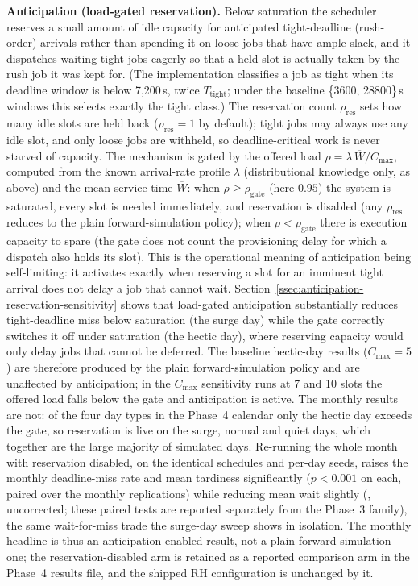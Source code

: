\textbf{Anticipation (load-gated reservation).} Below saturation the scheduler reserves a small amount of idle capacity for anticipated tight-deadline (rush-order) arrivals rather than spending it on loose jobs that have ample slack, and it dispatches waiting tight jobs eagerly so that a held slot is actually taken by the rush job it was kept for. (The implementation classifies a job as tight when its deadline window is below 7{,}200\,s, twice $T_{\text{tight}}$; under the baseline \{3600, 28800\}\,s windows this selects exactly the tight class.) The reservation count $\rho_{\text{res}}$ sets how many idle slots are held back ($\rho_{\text{res}}=1$ by default); tight jobs may always use any idle slot, and only loose jobs are withheld, so deadline-critical work is never starved of capacity. The mechanism is gated by the offered load $\rho = \lambda\,\overline{W}/C_{\max}$, computed from the known arrival-rate profile $\lambda$ (distributional knowledge only, as above) and the mean service time $\overline{W}$: when $\rho \geq \rho_{\text{gate}}$ (here $0.95$) the system is saturated, every slot is needed immediately, and reservation is disabled (any $\rho_{\text{res}}$ reduces to the plain forward-simulation policy); when $\rho < \rho_{\text{gate}}$ there is execution capacity to spare (the gate does not count the provisioning delay for which a dispatch also holds its slot). This is the operational meaning of anticipation being self-limiting: it activates exactly when reserving a slot for an imminent tight arrival does not delay a job that cannot wait. Section~\ref{ssec:anticipation-reservation-sensitivity} shows that load-gated anticipation substantially reduces tight-deadline miss below saturation (the surge day) while the gate correctly switches it off under saturation (the hectic day), where reserving capacity would only delay jobs that cannot be deferred. The baseline hectic-day results ($C_{\max}=5$) are therefore produced by the plain forward-simulation policy and are unaffected by anticipation; in the $C_{\max}$ sensitivity runs at 7 and 10 slots the offered load falls below the gate and anticipation is active. The monthly results are not: of the four day types in the Phase~4 calendar only the hectic day exceeds the gate, so reservation is live on the surge, normal and quiet days, which together are the large majority of simulated days. Re-running the whole month with reservation disabled, on the identical schedules and per-day seeds, raises the monthly deadline-miss rate and mean tardiness significantly ($p<0.001$ on each, paired over the monthly replications) while reducing mean wait slightly (\MonthResWaitP, uncorrected; these paired tests are reported separately from the Phase~3 family), the same wait-for-miss trade the surge-day sweep shows in isolation. The monthly headline is thus an anticipation-enabled result, not a plain forward-simulation one; the reservation-disabled arm is retained as a reported comparison arm in the Phase~4 results file, and the shipped RH configuration is unchanged by it.

